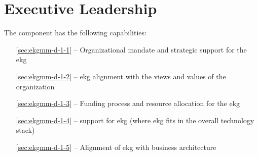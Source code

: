 \chapter{Executive Leadership}\label{ch:ekgmm-d-1}

The  component has the following capabilities:

\begin{itemize}[leftmargin=.5in]
  \item [\ref{sec:ekgmm-d-1-1}]  -- Organizational mandate and strategic support for the \gls{ekg}
  \item [\ref{sec:ekgmm-d-1-2}]  -- \gls{ekg} alignment with the views and values of the organization
  \item [\ref{sec:ekgmm-d-1-3}]  -- Funding process and resource allocation for the \gls{ekg}
  \item [\ref{sec:ekgmm-d-1-4}]  --  support for \gls{ekg} (where \gls{ekg} fits in the overall technology stack)
  \item [\ref{sec:ekgmm-d-1-5}]  -- Alignment of \gls{ekg} with business architecture
\end{itemize}








